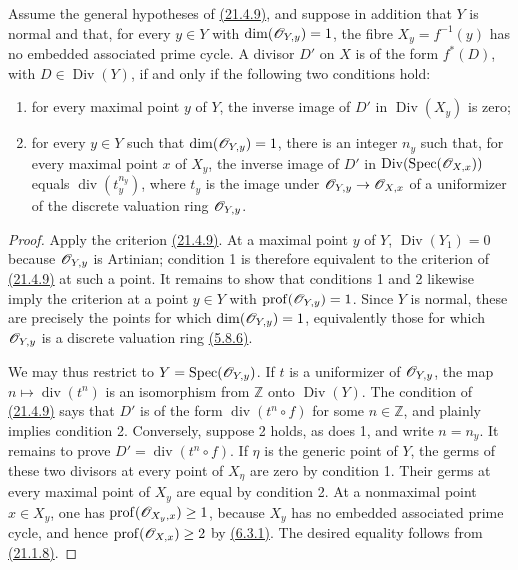 \begin{corollary}[21.4.10]
\ifdefined\EGAIVSuppressErratumLabels\else\label{IV.21.4.10}\fi
Assume the general hypotheses of {\hyperref[IV.21.4.9]{(21.4.9)}}, and suppose in addition that
$Y$ is normal and that, for every $y\in Y$ with
$\dim(\mathscr{O}_{Y,y})=1$, the fibre $X_y=f^{-1}(y)$ has no embedded
associated prime cycle.  A divisor $D'$ on $X$ is of the form $f^*(D)$,
with $D\in\operatorname{Div}(Y)$, if and only if the following two
conditions hold:
\begin{enumerate}[label=\textup{\arabic*\textdegree}]
\item for every maximal point $y$ of $Y$, the inverse image of $D'$ in
$\operatorname{Div}(X_y)$ is zero;
\item for every $y\in Y$ such that $\dim(\mathscr{O}_{Y,y})=1$, there is an
integer $n_y$ such that, for every maximal point $x$ of $X_y$, the
inverse image of $D'$ in
$\operatorname{Div}(\operatorname{Spec}(\mathscr{O}_{X,x}))$ equals
$\operatorname{div}(t_y^{n_y})$, where $t_y$ is the image under
$\mathscr{O}_{Y,y}\to\mathscr{O}_{X,x}$ of a uniformizer of the discrete
valuation ring $\mathscr{O}_{Y,y}$.
\end{enumerate}
\end{corollary}

\begin{proof}
Apply the criterion {\hyperref[IV.21.4.9]{(21.4.9)}}.  At a maximal point $y$ of $Y$,
$\operatorname{Div}(Y_1)=0$ because $\mathscr{O}_{Y,y}$ is Artinian;
condition 1\textdegree{} is therefore equivalent to the criterion of
{\hyperref[IV.21.4.9]{(21.4.9)}} at such a point.  It remains to show that conditions
1\textdegree{} and 2\textdegree{} likewise imply the criterion at a
point $y\in Y$ with $\operatorname{prof}(\mathscr{O}_{Y,y})=1$.  Since $Y$
is normal, these are precisely the points for which
$\dim(\mathscr{O}_{Y,y})=1$, equivalently those for which
$\mathscr{O}_{Y,y}$ is a discrete valuation ring {\hyperref[IV.5.8.6]{(5.8.6)}}.

We may thus restrict to $Y=\operatorname{Spec}(\mathscr{O}_{Y,y})$.  If $t$
is a uniformizer of $\mathscr{O}_{Y,y}$, the map
$n\mapsto\operatorname{div}(t^n)$ is an isomorphism from $\mathbb Z$
onto $\operatorname{Div}(Y)$.  The condition of {\hyperref[IV.21.4.9]{(21.4.9)}} says that
$D'$ is of the form $\operatorname{div}(t^n\circ f)$ for some
$n\in\mathbb Z$, and plainly implies condition 2\textdegree{}.
Conversely, suppose 2\textdegree{} holds, as does 1\textdegree{}, and
write $n=n_y$.  It remains to prove
$D'=\operatorname{div}(t^n\circ f)$.  If $\eta$ is the generic point of
$Y$, the germs of these two divisors at every point of $X_\eta$ are
zero by condition 1\textdegree{}.  Their germs at every maximal point
of $X_y$ are equal by condition 2\textdegree{}.  At a nonmaximal point
$x\in X_y$, one has
$\operatorname{prof}(\mathscr{O}_{X_y,x})\geq 1$, because $X_y$ has no
embedded associated prime cycle, and hence
$\operatorname{prof}(\mathscr{O}_{X,x})\geq 2$ by {\hyperref[IV.6.3.1]{(6.3.1)}}.  The desired
equality follows from {\hyperref[IV.21.1.8]{(21.1.8)}}.
\end{proof}

